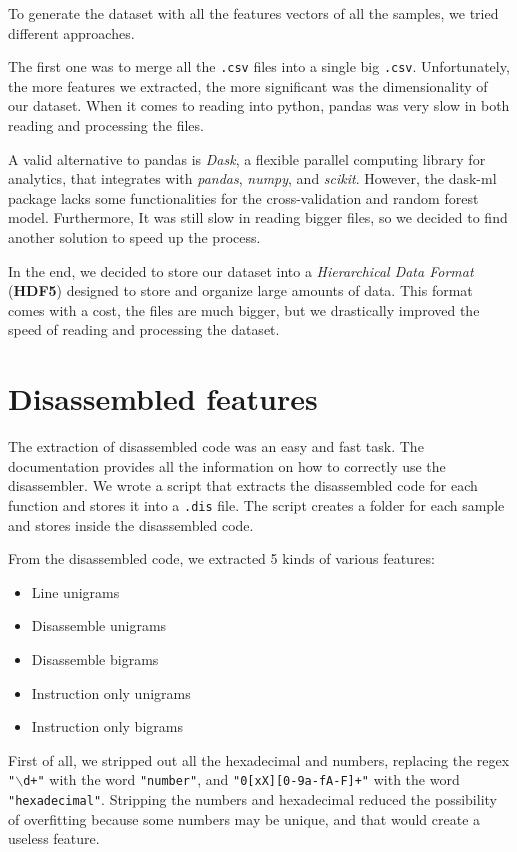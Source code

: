 To generate the dataset with all the features vectors of all the samples, we tried different approaches. 

The first one was to merge all the \texttt{.csv} files into a single big \texttt{.csv}. Unfortunately, the more features we extracted, the more significant was the dimensionality of our dataset.  When it comes to reading into python, pandas was very slow in both reading and processing the files.

A valid alternative to pandas is \textit{Dask}, a flexible parallel computing library for analytics, that integrates with \textit{pandas},  \textit{numpy}, and \textit{scikit}. However, the dask-ml package lacks some functionalities for the cross-validation and random forest model. Furthermore, It was still slow in reading bigger files, so we decided to find another solution to speed up the process.

In the end, we decided to store our dataset into a \textit{Hierarchical Data Format} (\textbf{HDF5}) designed to store and organize large amounts of data. This format comes with a cost, the files are much bigger, but we drastically improved the speed of reading and processing the dataset.


\section{Disassembled features}

The extraction of disassembled code was an easy and fast task. The documentation provides all the information on how to correctly use the disassembler. We wrote a script that extracts the disassembled code for each function and stores it into a \texttt{.dis} file. The script creates a folder for each sample and stores inside the disassembled code.

From the disassembled code, we extracted 5 kinds of various features:
\begin{itemize}
	\item{Line unigrams}
	\item{Disassemble unigrams}
	\item{Disassemble bigrams}
	\item{Instruction only unigrams}
	\item{Instruction only bigrams}
\end{itemize}

First of all, we stripped out all the hexadecimal and numbers, replacing the regex \texttt{"$\backslash$d+"} with the word \texttt{"number"}, and \texttt{"0[xX][0-9a-fA-F]+"} with the word \texttt{"hexadecimal"}. Stripping the numbers and hexadecimal reduced the possibility of overfitting because some numbers may be unique, and that would create a useless feature.


